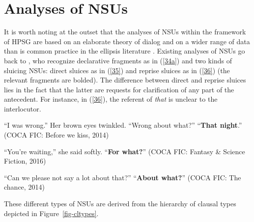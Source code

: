 \section{Analyses of NSUs}
\label{sec-analyses-of-NSUs}

It is worth noting at the outset that the analyses of NSUs within the framework of HPSG are based on an elaborate theory of dialog  and on a wider range of data than is common practice in the ellipsis literature \citep{Ginzburg1994, Ginzburg2004, Ginzburg2014a, Larsson2002, Purver2006, Fernandez2006, Fernandez2002, Fernandez2007, Ginzburg2010, Ginzburg2014b, Ginzburg2012, Ginzburg2013, Kim2019}. Existing analyses of NSUs go back to \citet{Ginzburg:Sag:2000}, who recognize declarative fragments as in (\ref{34a}) and two kinds of sluicing NSUs: direct sluices as in (\ref{35}) and reprise sluices as  in (\ref{36}) (the relevant fragments are bolded). The difference between direct and reprise sluices lies in the fact that the latter are requests for clarification of any part of the antecedent. For instance, in (\ref{36}), the referent of \textit{that} is unclear to the interlocutor.

\ea ``I was wrong.'' Her brown eyes twinkled. ``Wrong about what?'' ``\textbf{That night}.'' (COCA FIC: Before we kiss, 2014) \label{34a}\z

\ea ``You're waiting,'' she said softly. ``\textbf{For what?}'' (COCA FIC: Fantasy \& Science Fiction, 2016) \label{35} \z

\ea ``Can we please not say a lot about that?'' ``\textbf{About what?}'' (COCA FIC: The chance, 2014) \label{36} \z


These different types of NSUs are derived from the \citet[333]{Ginzburg:Sag:2000} hierarchy of clausal types depicted in Figure~\ref{fig-cltypes}.


